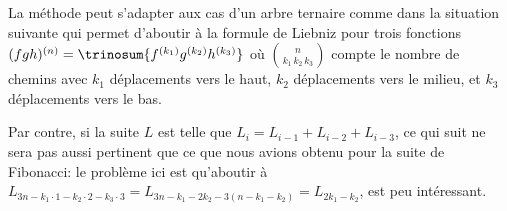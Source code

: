 La méthode peut s'adapter aux cas d'un arbre ternaire comme dans la situation suivante qui permet d'aboutir à la formule de Liebniz pour trois fonctions
$(fgh)^{(n)} = \trinosum{f^{(k_1)} g^{(k_2)} h^{(k_3)}}$
où
$\binom{n}{k_1\,k_2\,k_3}$ compte le nombre de chemins avec
$k_1$ déplacements vers le haut,
$k_2$ déplacements vers le milieu,
et
$k_3$ déplacements vers le bas.

%
                 {\intertreethree}{\prodderthree}


Par contre, si la suite $L$ est telle que $L_{i} = L_{i-1} + L_{i-2} + L_{i-3}$, ce qui suit ne sera pas aussi pertinent que ce que nous avions obtenu pour la suite de Fibonacci:
le problème ici est qu'aboutir à 
$ L_{3n - k_1\cdot1 - k_2\cdot2 - k_3\cdot3}
= L_{3n - k_1 - 2 k_2 - 3(n - k_1 - k_2)}
= L_{2 k_1 - k_2}$,
est peu intéressant.

%
                 {\intertreethree}{}
